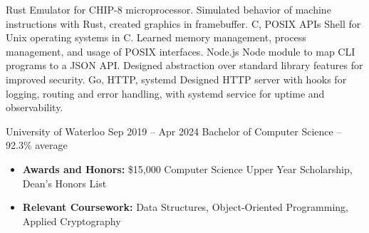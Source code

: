 \documentclass{article}
\begin{document}
\normalsize
{}
{Rust}
{Emulator for CHIP-8 microprocessor. Simulated behavior of machine instructions with
Rust, created graphics in framebuffer.}
\vspace{1.5mm}
{C, POSIX APIs}
{Shell for Unix operating systems in C. Learned memory management, process management,
and usage of POSIX interfaces. }
\vspace{1.5mm}
{Node.js}
{Node module to map CLI programs to a JSON API. Designed abstraction over standard
library features for improved security.}
\vspace{1.5mm}
{Go, HTTP, systemd}
{Designed HTTP server with hooks for logging, routing and error handling, with systemd service for uptime and observability.}

\EducationEntry
{University of Waterloo}
{Sep 2019 -- Apr 2024}
{Bachelor of Computer Science -- 92.3\% average}
{\begin{itemize} \itemsep -1pt
    \vspace{1mm}
    \item {\bf Awards and Honors:} \$15,000 Computer Science Upper Year Scholarship, Dean's Honors List
    \item {\bf Relevant Coursework:} Data Structures, Object-Oriented Programming, Applied Cryptography
    \end{itemize}}
\vspace{-2mm}
\end{document}
